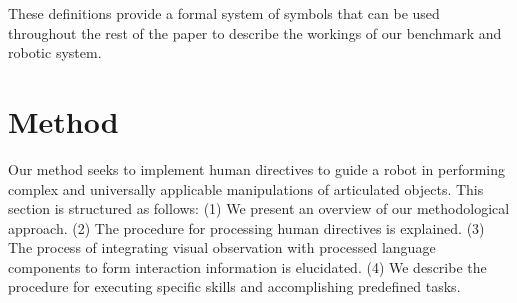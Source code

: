 \documentclass{article}
\begin{document}
These definitions provide a formal system of symbols that can be used throughout the rest of the paper to describe the workings of our benchmark and robotic system.








\section{Method}
Our method seeks to implement human directives to guide a robot in performing complex and universally applicable manipulations of articulated objects. This section is structured as follows:
(1) We present an overview of our methodological approach.
(2) The procedure for processing human directives is explained.
(3) The process of integrating visual observation with processed language components to form interaction information is elucidated.
(4) We describe the procedure for executing specific skills and accomplishing predefined tasks.
\end{document}
